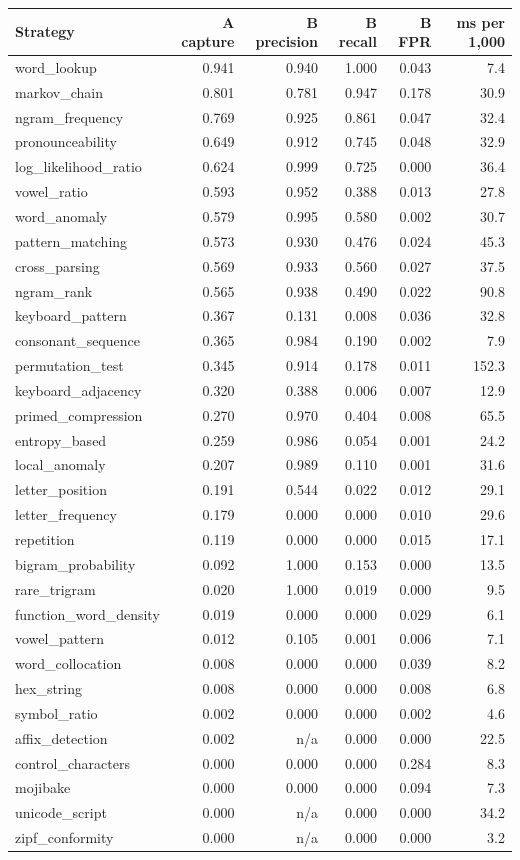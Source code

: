 \begin{tabular}{lrrrrr}
\toprule
Strategy & A capture & B precision & B recall & B FPR & ms per 1,000 \\
\midrule
word\_lookup & 0.941 & 0.940 & 1.000 & 0.043 & 7.4 \\
markov\_chain & 0.801 & 0.781 & 0.947 & 0.178 & 30.9 \\
ngram\_frequency & 0.769 & 0.925 & 0.861 & 0.047 & 32.4 \\
pronounceability & 0.649 & 0.912 & 0.745 & 0.048 & 32.9 \\
log\_likelihood\_ratio & 0.624 & 0.999 & 0.725 & 0.000 & 36.4 \\
vowel\_ratio & 0.593 & 0.952 & 0.388 & 0.013 & 27.8 \\
word\_anomaly & 0.579 & 0.995 & 0.580 & 0.002 & 30.7 \\
pattern\_matching & 0.573 & 0.930 & 0.476 & 0.024 & 45.3 \\
cross\_parsing & 0.569 & 0.933 & 0.560 & 0.027 & 37.5 \\
ngram\_rank & 0.565 & 0.938 & 0.490 & 0.022 & 90.8 \\
keyboard\_pattern & 0.367 & 0.131 & 0.008 & 0.036 & 32.8 \\
consonant\_sequence & 0.365 & 0.984 & 0.190 & 0.002 & 7.9 \\
permutation\_test & 0.345 & 0.914 & 0.178 & 0.011 & 152.3 \\
keyboard\_adjacency & 0.320 & 0.388 & 0.006 & 0.007 & 12.9 \\
primed\_compression & 0.270 & 0.970 & 0.404 & 0.008 & 65.5 \\
entropy\_based & 0.259 & 0.986 & 0.054 & 0.001 & 24.2 \\
local\_anomaly & 0.207 & 0.989 & 0.110 & 0.001 & 31.6 \\
letter\_position & 0.191 & 0.544 & 0.022 & 0.012 & 29.1 \\
letter\_frequency & 0.179 & 0.000 & 0.000 & 0.010 & 29.6 \\
repetition & 0.119 & 0.000 & 0.000 & 0.015 & 17.1 \\
bigram\_probability & 0.092 & 1.000 & 0.153 & 0.000 & 13.5 \\
rare\_trigram & 0.020 & 1.000 & 0.019 & 0.000 & 9.5 \\
function\_word\_density & 0.019 & 0.000 & 0.000 & 0.029 & 6.1 \\
vowel\_pattern & 0.012 & 0.105 & 0.001 & 0.006 & 7.1 \\
word\_collocation & 0.008 & 0.000 & 0.000 & 0.039 & 8.2 \\
hex\_string & 0.008 & 0.000 & 0.000 & 0.008 & 6.8 \\
symbol\_ratio & 0.002 & 0.000 & 0.000 & 0.002 & 4.6 \\
affix\_detection & 0.002 & n/a & 0.000 & 0.000 & 22.5 \\
control\_characters & 0.000 & 0.000 & 0.000 & 0.284 & 8.3 \\
mojibake & 0.000 & 0.000 & 0.000 & 0.094 & 7.3 \\
unicode\_script & 0.000 & n/a & 0.000 & 0.000 & 34.2 \\
zipf\_conformity & 0.000 & n/a & 0.000 & 0.000 & 3.2 \\
\bottomrule
\end{tabular}
